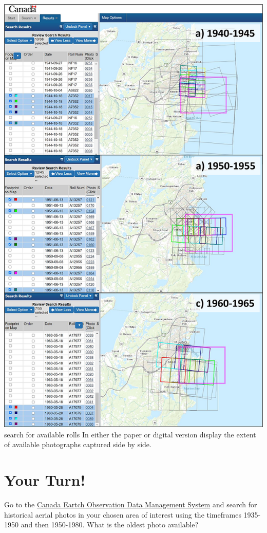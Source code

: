 \documentclass[
]{book}
\begin{document}
\includegraphics{images/04-accessing-aerial-photos.png}
search for available rolls In either the paper or digital version display the extent of available photographs captured side by side.

\hypertarget{your-turn-4}{%
\section*{Your Turn!}\label{your-turn-4}}

Go to the \href{https://www.eodms-sgdot.nrcan-rncan.gc.ca/index-en.html}{Canada Eartch Observation Data Management System} and search for historical aerial photos in your chosen area of interest using the timeframes 1935-1950 and then 1950-1980. What is the oldest photo available?
\end{document}
